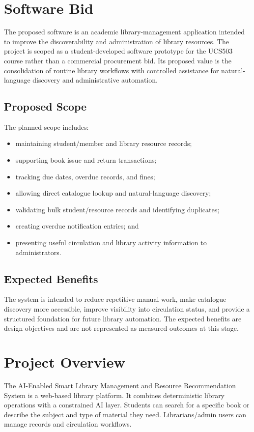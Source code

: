 \documentclass[12pt,a4paper]{report}
\begin{document}
\section{Software Bid}
The proposed software is an academic library-management application intended to improve the discoverability and administration of library resources. The project is scoped as a student-developed software prototype for the UCS503 course rather than a commercial procurement bid. Its proposed value is the consolidation of routine library workflows with controlled assistance for natural-language discovery and administrative automation.

\subsection{Proposed Scope}
The planned scope includes:
\begin{itemize}
\item maintaining student/member and library resource records;
\item supporting book issue and return transactions;
\item tracking due dates, overdue records, and fines;
\item allowing direct catalogue lookup and natural-language discovery;
\item validating bulk student/resource records and identifying duplicates;
\item creating overdue notification entries; and
\item presenting useful circulation and library activity information to administrators.
\end{itemize}

\subsection{Expected Benefits}
The system is intended to reduce repetitive manual work, make catalogue discovery more accessible, improve visibility into circulation status, and provide a structured foundation for future library automation. The expected benefits are design objectives and are not represented as measured outcomes at this stage.

\section{Project Overview}
The AI-Enabled Smart Library Management and Resource Recommendation System is a web-based library platform. It combines deterministic library operations with a constrained AI layer. Students can search for a specific book or describe the subject and type of material they need. Librarians/admin users can manage records and circulation workflows.
\end{document}
